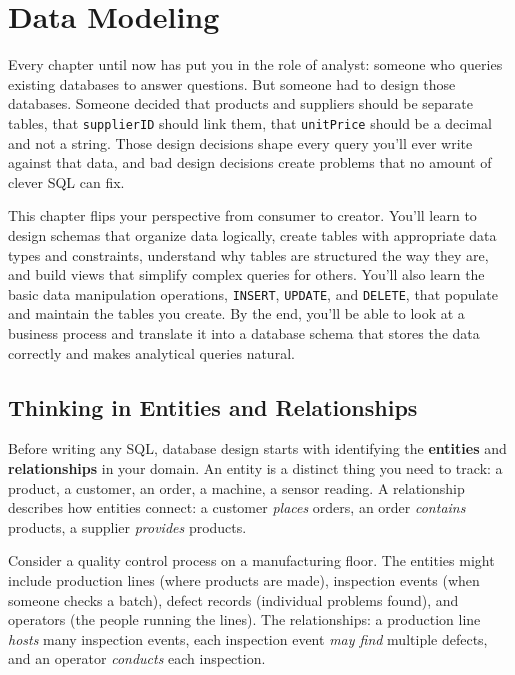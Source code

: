 \documentclass[
  letterpaper,
  DIV=11,
  numbers=noendperiod]{scrreprt}
\begin{document}
\chapter{Data Modeling}\label{data-modeling}

Every chapter until now has put you in the role of analyst: someone who
queries existing databases to answer questions. But someone had to
design those databases. Someone decided that products and suppliers
should be separate tables, that \texttt{supplierID} should link them,
that \texttt{unitPrice} should be a decimal and not a string. Those
design decisions shape every query you'll ever write against that data,
and bad design decisions create problems that no amount of clever SQL
can fix.

This chapter flips your perspective from consumer to creator. You'll
learn to design schemas that organize data logically, create tables with
appropriate data types and constraints, understand why tables are
structured the way they are, and build views that simplify complex
queries for others. You'll also learn the basic data manipulation
operations, \texttt{INSERT}, \texttt{UPDATE}, and \texttt{DELETE}, that
populate and maintain the tables you create. By the end, you'll be able
to look at a business process and translate it into a database schema
that stores the data correctly and makes analytical queries natural.

\section{Thinking in Entities and
Relationships}\label{thinking-in-entities-and-relationships}

Before writing any SQL, database design starts with identifying the
\textbf{entities} and \textbf{relationships} in your domain. An entity
is a distinct thing you need to track: a product, a customer, an order,
a machine, a sensor reading. A relationship describes how entities
connect: a customer \emph{places} orders, an order \emph{contains}
products, a supplier \emph{provides} products.

Consider a quality control process on a manufacturing floor. The
entities might include production lines (where products are made),
inspection events (when someone checks a batch), defect records
(individual problems found), and operators (the people running the
lines). The relationships: a production line \emph{hosts} many
inspection events, each inspection event \emph{may find} multiple
defects, and an operator \emph{conducts} each inspection.
\end{document}
